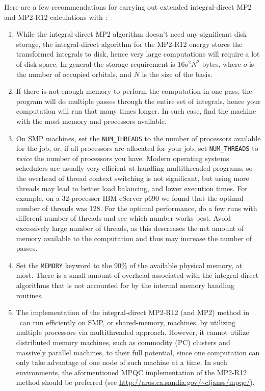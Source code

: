 Here are a few recommendations for carrying out extended integral-direct MP2 and
MP2-R12 calculations with \PSIthree: 
\begin{enumerate}
\item While the integral-direct MP2 algorithm doesn't need any
significant disk storage,
the integral-direct algorithm for the MP2-R12 energy
stores the transformed integrals to disk, hence very large
computations will require a lot of disk space. In general
the storage requirement is $16 o^2N^2$ bytes, where $o$
is the number of occupied orbitals, and $N$ is the size of the basis.
\item If there is not enough memory to perform the computation in one pass,
the program will do multiple passes through the entire set of integrals,
hence your computation will run that many times longer.
In such case, find the machine with the most memory and processors available.
\item On SMP machines, set the {\tt NUM\_THREADS} to the number of
processors available for the job, or, if all processors are allocated for
your job, set {\tt NUM\_THREADS} to {\em twice} the number of processors
you have. Modern operating systems schedulers are usually very efficient
at handling multithreaded programs, so the overhead of thread context
switching is not significant, but using more threads may lead to better
load balancing, and lower execution times. For example, on a 32-processor
IBM eServer p690 we found that the optimal number of threads was 128.
For the optimal performance, do a few runs with different number of threads
and see which number works best.
Avoid excessively large
number of threads, as this descreases the net amount of memory available to
the computation and thus may increase the number of passes. 
\item
Set the {\tt MEMORY} keyword to the 90\% of the available physical
memory, at most. There is a small amount of overhead associated with the
integral-direct algorithms that is not accounted for by the internal memory
handling routines.
\item
The implementation of the integral-direct MP2-R12 (and MP2) method
in \PSIthree\ can run efficiently on SMP, or shared-memory, machines,
by utilizing multiple processors via multithreaded approach.
However, it cannot utilize distributed memory machines,
such as commodity (PC) clusters and massively parallel machines,
to their full potential, since one computation can only take advantage
of one node of such machine at a time.
In such environments, the aformentioned MPQC implementation of
the MP2-R12 method should be preferred
(see \url{http://aros.ca.sandia.gov/~cljanss/mpqc/}).
\end{enumerate}
